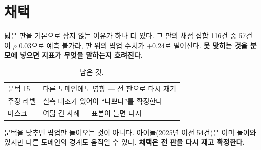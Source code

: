 \documentclass[10pt]{article}
\begin{document}

\section{채택}


넓은 판을 기본으로 삼지 않는 이유가 하나 더 있다. 그 판의 채점 집합 116건
중 57건이 $\rho$ 0.03으로 예측 불가라, 판 위의 팝업 수치가 $+$0.24로
떨어진다. \textbf{못 맞히는 것을 분모에 넣으면 지표가 무엇을 말하는지
흐려진다.}

\begin{table}[t]
\centering\tsize
\caption{남은 것.}
\begin{tabular}{ll}
\toprule
문턱 15 & 다른 도메인에도 영향 --- 전 판으로 다시 재기 \\
주장 라벨 & 실측 대조가 있어야 ``나쁘다''를 확정한다 \\
마스크 & 여덟 건 사례 --- 표본이 늘면 다시 \\
\bottomrule
\end{tabular}
\end{table}

문턱을 낮추면 팝업만 들어오는 것이 아니다. 아이돌(2025년 이전 54건)은
이미 들어와 있지만 다른 도메인의 경계도 움직일 수 있다. \textbf{채택은
전 판을 다시 재고 확정한다.}
\end{document}
